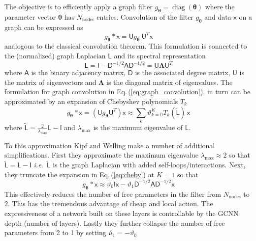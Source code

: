 \documentclass[12pt,reqno]{article}
\newcommand{\eref}[1]{Eq.\,(\ref{#1})}
\newcommand{\ie}{{\it i.e.}\!\, }
\newcommand{\As}{\mathsf{A}}
\newcommand{\Ds}{\mathsf{D}}
\newcommand{\xs}{\mathsf{x}}
\newcommand{\Is}{\mathsf{I}}
\newcommand{\Us}{\mathsf{U}}
\newcommand{\Ls}{\mathsf{L}}
\newcommand{\thetab}{{\boldsymbol{\theta}}}
\newcommand{\Lambdab}{{\boldsymbol{\Lambda}}}
\newcommand{\diag}{{\operatorname{diag}}}
\begin{document}
The objective is to efficiently apply a graph filter $g_\thetab = \diag(\thetab)$ where the parameter vector $\thetab$ has $N_\text{nodes}$ entries.
Convolution of the filter $g_\thetab$ and data $\xs$ on a graph can be expressed as \cite{hammond2011wavelets}
\begin{equation} \label{eq:graph_convolution}
g_\thetab \ast \xs =  \Us g_\thetab \ \Us^T \xs
\end{equation}
analogous to the classical convolution theorem.
This formulation is connected to the (normalized) graph Laplacian $\Ls$ and its spectral representation
\begin{equation}
\Ls = \Is - \Ds^{-1/2} \As \Ds^{-1/2} = \Us \Lambdab \Us^T
\end{equation}
where $\As$ is the binary adjacency matrix, $\Ds$ is the associated degree matrix,  $\Us$ is the matrix of eigenvectors and $\Lambdab$ is the diagonal matrix of eigenvalues.
The formulation for graph convolution in \eref{eq:graph_convolution}, in turn can be approximated by an expansion of Chebyshev polynomials $T_k$ \cite{defferrard2016convolutional}
\begin{equation} \label{eq:cheby}
g_\thetab \ast \xs = \left( \Us g_\thetab  \Us^T \right) \xs
\approx \sum_k \vartheta_{k=0}^K T_k(\tilde{\Ls}) \, \xs
\end{equation}
where $\tilde{\Ls} = \frac{2}{\lambda_\text{max}} \Ls - \Is$ and $\lambda_\text{max}$ is the maximum eigenvalue of $\Ls$.

To this approximation Kipf and Welling make a number of additional simplifications.
First they approximate the maximum eigenvalue $\lambda_\text{max} \approx 2$ so that $\tilde{\Ls} = \Ls - \Is$ \ie $\tilde{\Ls}$ is the graph Laplacian with added self-loops/interactions.
Next, they truncate the expansion in \eref{eq:cheby} at $K=1$ so that
\begin{equation}
g_\thetab \ast \xs
\approx \vartheta_0 \Is \xs - \vartheta_1 \Ds^{-1/2} \As \Ds^{-1/2} \xs
\end{equation}
This effectively reduces the number of free parameters in the filter from $N_\text{nodes}$ to 2.
This has the tremendous advantage of cheap and local action.
The expressiveness of a network built on these layers is controllable by the GCNN depth (number of layers).
Lastly they further collapse the number of free parameters from 2 to 1 by setting $\vartheta_1 = - \vartheta_0$
\end{document}
